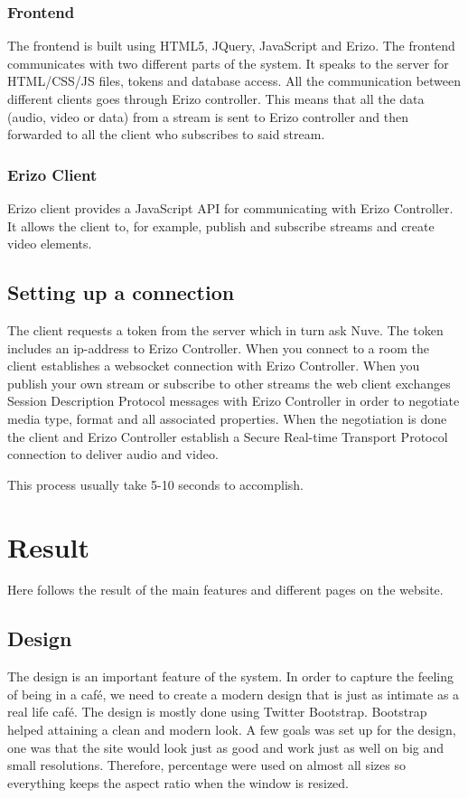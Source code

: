 \documentclass[12pt, titlepage]{article}
\begin{document}
\subsubsection{Frontend}
The frontend is built using HTML5, JQuery, JavaScript and Erizo. The frontend communicates with two different parts of the system. It speaks to the server for HTML/CSS/JS files, tokens and database access. All the communication between different clients goes through Erizo controller. This means that all the data (audio, video or data) from a stream is sent to Erizo controller and then forwarded to all the client who subscribes to said stream.
\subsubsection{Erizo Client}
Erizo client provides a JavaScript API for communicating with Erizo Controller. It allows the client to, for example, publish and subscribe streams and create video elements.
\subsection{Setting up a connection}
The client requests a token from the server which in turn ask Nuve. The token includes an ip-address to Erizo Controller. When you connect to a room the client establishes a websocket connection with Erizo Controller. When you publish your own stream or subscribe to other streams the web client exchanges Session Description Protocol messages with Erizo Controller in order to negotiate media type, format and all associated properties. When the negotiation is done the client and Erizo Controller establish a Secure Real-time Transport Protocol connection to deliver audio and video.

This process usually take 5-10 seconds to accomplish.
\section{Result}
Here follows the result of the main features and different pages on the website.
\subsection{Design}
The design is an important feature of the system. In order to capture the feeling of being in a café, we need to create a modern design that is just as intimate as a real life café. The design is mostly done using Twitter Bootstrap. Bootstrap helped attaining a clean and modern look. A few goals was set up for the design, one was that the site would look just as good and work just as well on big and small resolutions. Therefore, percentage were used on almost all sizes so everything keeps the aspect ratio when the window is resized. 
\end{document}
